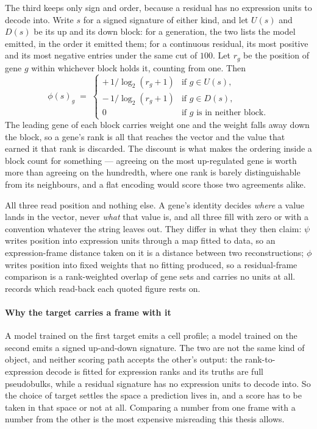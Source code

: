 The third keeps only sign and order, because a residual has no expression units to
decode into. Write $s$ for a signed signature of either kind, and let $U(s)$ and
$D(s)$ be its up and its down block: for a generation, the two lists the model
emitted, in the order it emitted them; for a continuous residual, its most
positive and its most negative entries under the same cut of $100$. Let $r_g$ be
the position of gene $g$ within whichever block holds it, counting from one. Then
\begin{equation}
 \phi(s)_g \;=\;
 \begin{cases}
   +\,1/\log_{2}(r_g + 1) & \text{if } g \in U(s),\\[2pt]
   -\,1/\log_{2}(r_g + 1) & \text{if } g \in D(s),\\[2pt]
   0 & \text{if $g$ is in neither block.}
 \end{cases}
\end{equation}
The leading gene of each block carries weight one and the weight falls away down
the block, so a gene's rank is all that reaches the vector and the value that
earned it that rank is discarded. The discount is what makes the ordering inside a
block count for something --- agreeing on the most up-regulated gene is worth more
than agreeing on the hundredth, where one rank is barely distinguishable from its
neighbours, and a flat encoding would score those two agreements alike.

All three read position and nothing else. A gene's identity decides \emph{where}
a value lands in the vector, never \emph{what} that value is, and all three fill
with zero or with a convention whatever the string leaves out. They differ in what
they then claim: $\psi$ writes position into expression units through a map fitted
to data, so an expression-frame distance taken on it is a distance between two
reconstructions; $\phi$ writes position into fixed weights that no fitting
produced, so a residual-frame comparison is a rank-weighted overlap of gene sets
and carries no units at all.  records which read-back each quoted
figure rests on.
\paragraph{Why the target carries a frame with it} A model trained on the first
target emits a cell profile; a model trained on the second emits a signed
up-and-down signature. The two are not the same kind of object, and neither
scoring path accepts the other's output: the rank-to-expression decode is fitted
for expression ranks and its truths are full pseudobulks, while a residual
signature has no expression units to decode into. So the choice of target
settles the space a prediction lives in, and a score has to be taken in that
space or not at all. Comparing a number from one frame with a number from the
other is the most expensive misreading this thesis allows.

